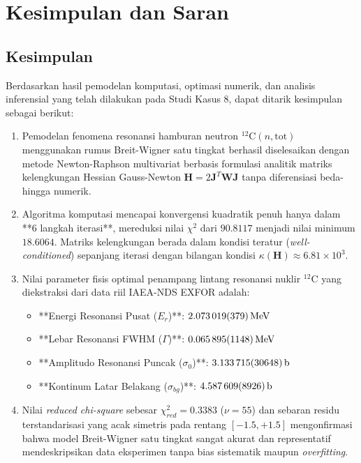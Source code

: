 \section{Kesimpulan dan Saran}

\subsection*{Kesimpulan}
Berdasarkan hasil pemodelan komputasi, optimasi numerik, dan analisis inferensial yang telah dilakukan pada Studi Kasus 8, dapat ditarik kesimpulan sebagai berikut:
\begin{enumerate}
    \item Pemodelan fenomena resonansi hamburan neutron $^{12}\text{C}(n,\text{tot})$ menggunakan rumus Breit-Wigner satu tingkat berhasil diselesaikan dengan metode Newton-Raphson multivariat berbasis formulasi analitik matriks kelengkungan Hessian Gauss-Newton $\mathbf{H} = 2\mathbf{J}^T\mathbf{W}\mathbf{J}$ tanpa diferensiasi beda-hingga numerik.
    \item Algoritma komputasi mencapai konvergensi kuadratik penuh hanya dalam **6 langkah iterasi**, mereduksi nilai $\chi^2$ dari $90.8117$ menjadi nilai minimum $18.6064$. Matriks kelengkungan berada dalam kondisi teratur (\textit{well-conditioned}) sepanjang iterasi dengan bilangan kondisi $\kappa(\mathbf{H}) \approx 6.81 \times 10^3$.
    \item Nilai parameter fisis optimal penampang lintang resonansi nuklir $^{12}\text{C}$ yang diekstraksi dari data riil IAEA-NDS EXFOR adalah:
    \begin{itemize}
        \item **Energi Resonansi Pusat ($E_r$)**: $\SI{2.073019 \pm 0.000379}{\mega\electronvolt}$
        \item **Lebar Resonansi FWHM ($\Gamma$)**: $\SI{0.065895 \pm 0.001148}{\mega\electronvolt}$
        \item **Amplitudo Resonansi Puncak ($\sigma_0$)**: $\SI{3.133715 \pm 0.030648}{\barn}$
        \item **Kontinum Latar Belakang ($\sigma_{bg}$)**: $\SI{4.587609 \pm 0.008926}{\barn}$
    \end{itemize}
    \item Nilai \textit{reduced chi-square} sebesar $\chi^2_{red} = 0.3383$ ($\nu = 55$) dan sebaran residu terstandarisasi yang acak simetris pada rentang $[-1.5, +1.5]$ mengonfirmasi bahwa model Breit-Wigner satu tingkat sangat akurat dan representatif mendeskripsikan data eksperimen tanpa bias sistematik maupun \textit{overfitting}.

\end{enumerate}
